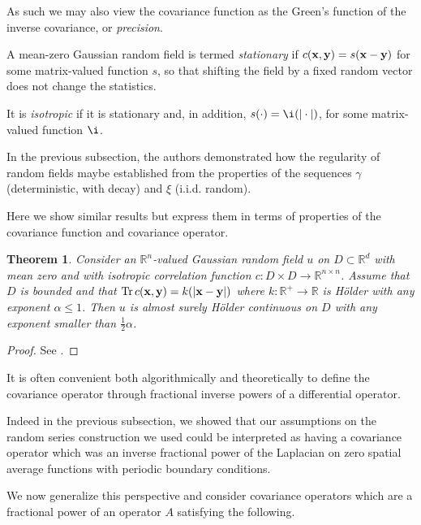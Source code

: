 \documentclass[oneside,11pt]{book}
\numberwithin{equation}{section}
\newtheorem{theorem}{Theorem}[section]
\begin{document}
As such we may also view the covariance function as the Green's function of the inverse covariance, or \textit{precision}.

%
A mean-zero Gaussian random field is termed \textit{stationary} if $c({\bf x},{\bf y}) = s({\bf x} - {\bf y})$ for some matrix-valued function $s$, so that shifting the field by a fixed random vector does not change the statistics.

It is \textit{isotropic} if it is stationary and, in addition, $s(\cdot) = \i(|\cdot|)$, for some matrix-valued function $\i$.

%
In the previous subsection, the authors demonstrated how the regularity of random fields maybe established from the properties of the sequences $\gamma$ (deterministic, with decay) and $\xi$ (i.i.d. random).

Here we show similar results but express them in terms of properties of the covariance function and covariance operator.

\begin{theorem}
    Consider an $\mathbb{R}^n$-valued Gaussian random field $u$ on $D\subset\mathbb{R}^d$ with mean zero and with isotropic correlation function $c:D\times D\to\mathbb{R}^{n\times n}$. Assume that $D$ is bounded and that $\operatorname{Tr}c({\bf x},{\bf y}) = k(|{\bf x} - {\bf y}|)$ where $k:\mathbb{R}^+\to\mathbb{R}$ is H\"older with any exponent $\alpha\le 1$. Then $u$ is almost surely H\"older continuous on $D$ with any exponent smaller than $\frac{1}{2}\alpha$.
\end{theorem}

\begin{proof}
    See \cite[p. 337]{Dashti_Stuart2017}.
\end{proof}
It is often convenient both algorithmically and theoretically to define the covariance operator through fractional inverse powers of a differential operator.

Indeed in the previous subsection, we showed that our assumptions on the random series construction we used could be interpreted as having a covariance operator which was an inverse fractional power of the Laplacian on zero spatial average functions with periodic boundary conditions.

We now generalize this perspective and consider covariance operators which are a fractional power of an operator $A$ satisfying the following.
\end{document}
